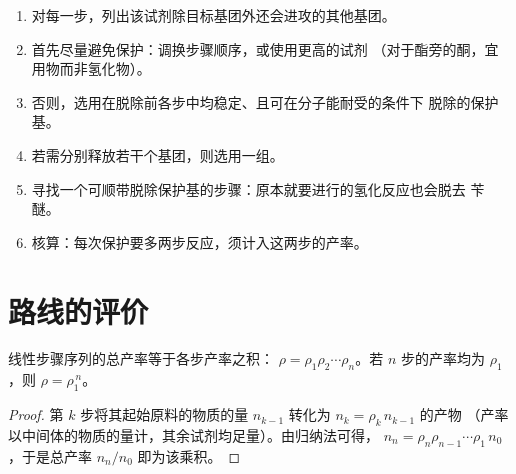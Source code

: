 \begin{method}[路线中的保护]\label{met:b2:retrosynthesis:protect-in-route}
\begin{enumerate}
  \item 对每一步，列出该试剂除目标基团外还会进攻的其他基团。
  \item 首先尽量避免保护：调换步骤顺序，或使用更高的试剂
        （对于酯旁的酮，宜用物而非氢化物）。
  \item 否则，选用在脱除前各步中均稳定、且可在分子能耐受的条件下
        脱除的保护基。
  \item 若需分别释放若干个基团，则选用一组。
  \item 寻找一个可顺带脱除保护基的步骤：原本就要进行的氢化反应也会脱去
        苄醚。
  \item 核算：每次保护要多两步反应，须计入这两步的产率。
\end{enumerate}
\end{method}

\section{路线的评价}\label{sec:b2:retrosynthesis:judging}

\begin{proposition}[总产率]\label{prop:b2:retrosynthesis:overall-yield}
线性步骤序列的总产率等于各步产率之积：
$\rho = \rho_1 \rho_2 \cdots \rho_n$。若 $n$ 步的产率均为 $\rho_1$，则 $\rho = \rho_1^{\,n}$。
\end{proposition}

\begin{proof}
第 $k$ 步将其起始原料的物质的量 $n_{k-1}$ 转化为 $n_k = \rho_k\, n_{k-1}$ 的产物
（产率以中间体的物质的量计，其余试剂均足量）。由归纳法可得，
$n_n = \rho_n \rho_{n-1} \cdots \rho_1\, n_0$，于是总产率 $n_n/n_0$ 即为该乘积。
\end{proof}

